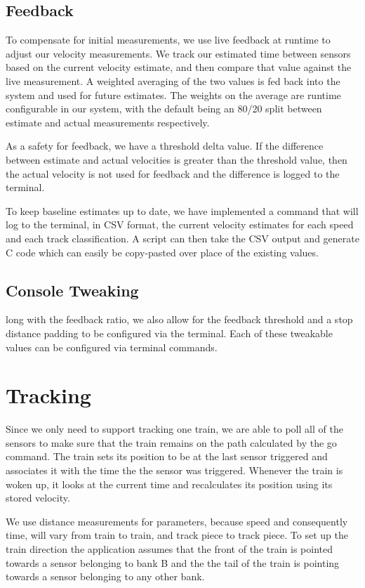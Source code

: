 \documentclass[pdftex,10pt,a4paper]{article}
\begin{document}
\subsection*{Feedback}

To compensate for initial measurements, we use live feedback at runtime
to adjust our velocity measurements. We track our estimated time
between sensors based on the current velocity estimate, and then
compare that value against the live measurement. A weighted averaging of
the two values is fed back into the system and used for future estimates.
The weights on the average are runtime configurable in our system, with
the default being an 80/20 split between estimate and actual measurements
respectively.

As a safety for feedback, we have a threshold delta value. If the
difference between estimate and actual velocities is greater than the
threshold value, then the actual velocity is not used for feedback and
the difference is logged to the terminal.

To keep baseline estimates up to date, we have implemented a 
command that will log to the terminal, in CSV format, the current
velocity estimates for each speed and each track classification. A script
can then take the CSV output and generate C code which can easily be
copy-pasted over place of the existing values.

\subsection*{Console Tweaking}

long with the feedback ratio, we also allow for the feedback threshold
and a stop distance padding to be configured via the terminal. Each of
these tweakable values can be configured via terminal commands.

\section*{Tracking}

Since we only need to support tracking one train, we are able to poll
all of the sensors to make sure that the train remains on the path
calculated by the go command. The train sets its position to be at the
last sensor triggered and associates it with the time the the sensor was
triggered. Whenever the train is woken up, it looks at the
current time and recalculates its position using its stored velocity.

We use distance measurements for parameters, because speed and
consequently time, will vary from train to train, and track piece to
track piece. To set up the train direction the application assumes that
the front of the train is pointed towards a sensor belonging to bank B
and the the tail of the train is pointing towards a sensor belonging to
any other bank.
\end{document}
